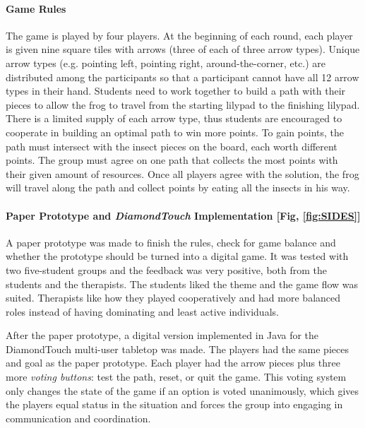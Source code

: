 \documentclass[runningheads]{llncs}
\begin{document}
\paragraph{Game Rules} The game is played by four players. At the beginning of each round, each player is given nine square tiles with arrows (three of each of three arrow types). Unique arrow types (e.g. pointing left, pointing right, around-the-corner, etc.) are distributed among the participants so that a participant cannot have all 12 arrow types in their hand. Students need to work together to build a path with their pieces to allow the frog to travel from the starting lilypad to the finishing lilypad. There is a limited supply of each arrow type, thus students are encouraged to cooperate in building an optimal path to win more points. To gain points, the path must intersect with the insect pieces on the board, each worth different points. The group must agree on one path that collects the most points with their given amount of resources. Once all players agree with the solution, the frog will travel along the path and collect points by eating all the insects in his way.

\paragraph{Paper Prototype and \textit{DiamondTouch} Implementation [Fig, \ref{fig:SIDES}]} A paper prototype was made to finish the rules, check for game balance and whether the prototype should be turned into a digital game. It was tested with two five-student groups and the feedback was very positive, both from the students and the therapists. The students liked the theme and the game flow was suited. Therapists like how they played cooperatively and had more balanced roles instead of having dominating and least active individuals.
\par After the paper prototype, a digital version implemented in Java for the DiamondTouch multi-user tabletop was made. The players had the same pieces and goal as the paper prototype. Each player had the arrow pieces plus three more \textit{voting buttons}: test the path, reset, or quit the game. This voting system only changes the state of the game if an option is voted unanimously, which gives the players equal status in the situation and forces the group into engaging in communication and coordination.
\end{document}
